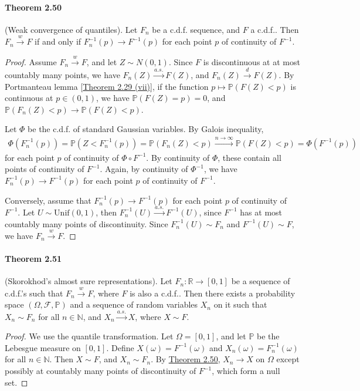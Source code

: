 \documentclass{article}
\numberwithin{equation}{section}
\renewcommand{\P}{\mathbb{P}}
\theoremstyle{plain}
\theoremstyle{definition}
\begin{document}
\paragraph{Theorem 2.50\label{thm:2.50}} (Weak convergence of quantiles). Let $F_n$ be a c.d.f. sequence, and $F$ a c.d.f.. Then $F_n\overset{w}{\to}F$ if and only if $F_n^{-1}(p)\to F^{-1}(p)$ for each point $p$ of continuity of $F^{-1}$. 
\begin{proof}
Assume $F_n\overset{w}{\to} F$, and let $Z\sim N(0,1)$. Since $F$ is discontinuous at at most countably many points, we have $F_n(Z)\overset{a.s.}{\to}F(Z)$, and $F_n(Z)\overset{d}{\to}F(Z)$. By Portmanteau lemma [\hyperref[thm:2.29]{Theorem 2.29 (vii)}], if the function $p\mapsto\P(F(Z)<p)$ is continuous at $p\in(0,1)$, we have $\P(F(Z)=p)=0$, and $\P(F_n(Z)<p)\to\P(F(Z)<p)$.

Let $\Phi$ be the c.d.f. of standard Gaussian variables. By Galois inequality,
\begin{align*}
	\Phi(F_n^{-1}(p))=\P(Z<F_n^{-1}(p))=\P(F_n(Z)<p)\overset{n\to\infty}{\to}\P(F(Z)<p)=\Phi(F^{-1}(p))
\end{align*}  
for each point $p$ of continuity of $\Phi\circ F^{-1}$. By continuity of $\Phi$, these contain all points of continuity of $F^{-1}$. Again, by continuity of $\Phi^{-1}$, we have $F_n^{-1}(p)\to F^{-1}(p)$ for each point $p$ of continuity of $F^{-1}$.

Conversely, assume that $F_n^{-1}(p)\to F^{-1}(p)$ for each point $p$ of continuity of $F^{-1}$. Let $U\sim\mathrm{Unif}(0,1)$, then $F_n^{-1}(U)\overset{a.s.}{\to}F^{-1}(U)$, since $F^{-1}$ has at most countably many points of discontinuity. Since $F_n^{-1}(U)\sim F_n$ and $F^{-1}(U)\sim F$, we have $F_n\overset{w}{\to}F$.
\end{proof}

\paragraph{Theorem 2.51\label{thm:2.51}} (Skorokhod's almost sure representations). Let $F_n:\mathbb{R}\to[0,1]$ be a sequence of c.d.f.'s such that $F_n\overset{w}{\to} F$, where $F$ is also a c.d.f.. Then there exists a probability space $(\Omega,\mathscr{F},\P)$ and a sequence of random variables $X_n$ on it such that $X_n\sim F_n$ for all $n\in\mathbb{N}$, and $X_n\overset{a.s.}{\to} X$, where $X\sim F$.
\begin{proof}
We use the quantile transformation. Let $\Omega=[0,1]$, and let $\P$ be the Lebesgue measure on $[0,1]$. Define $X(\omega)= F^{-1}(\omega)$ and $X_n(\omega)=F_n^{-1}(\omega)$ for all $n\in\mathbb{N}$. Then $X\sim F$, and $X_n\sim F_n$. By \hyperref[thm:2.50]{Theorem 2.50}, $X_n\to X$ on $\Omega$ except possibly at countably many points of discontinuity of $F^{-1}$, which form a null set.
\end{proof}
\end{document}
